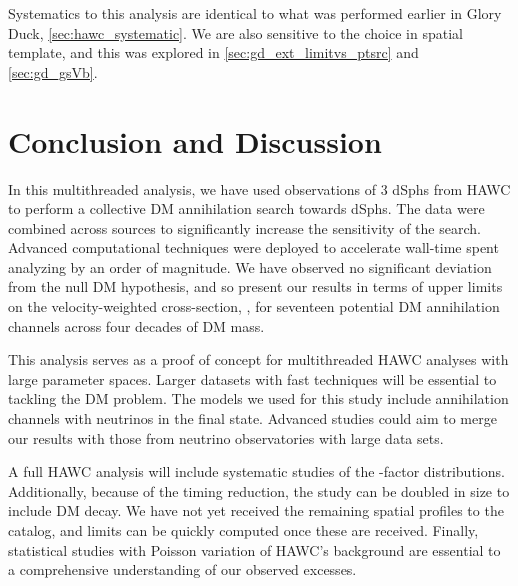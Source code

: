 Systematics to this analysis are identical to what was performed earlier in Glory Duck, \cref{sec:hawc_systematic}.
We are also sensitive to the choice in spatial template, and this was explored in \cref{sec:gd_ext_limitvs_ptsrc} and \cref{sec:gd_gsVb}.

\section{Conclusion and Discussion}\label{sec:mtd_conclusion}

In this multithreaded analysis, we have used observations of 3 dSphs from HAWC to perform a collective DM annihilation search towards dSphs.
The data were combined across sources to significantly increase the sensitivity of the search.
Advanced computational techniques were deployed to accelerate wall-time spent analyzing by an order of magnitude.
We have observed no significant deviation from the null DM hypothesis, and so present our results in terms of upper limits on the velocity-weighted cross-section, \sv, for seventeen potential DM annihilation channels across four decades of DM mass.

This analysis serves as a proof of concept for multithreaded HAWC analyses with large parameter spaces.
Larger datasets with fast techniques will be essential to tackling the DM problem.
The models we used for this study include annihilation channels with neutrinos in the final state.
Advanced studies could aim to merge our results with those from neutrino observatories with large data sets.

A full HAWC analysis will include systematic studies of the \J-factor distributions.
Additionally, because of the timing reduction, the study can be doubled in size to include DM decay.
We have not yet received the remaining spatial profiles to the \LS catalog, and limits can be quickly computed once these are received.
Finally, statistical studies with Poisson variation of HAWC's background are essential to a comprehensive understanding of our observed excesses.